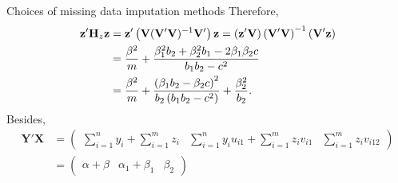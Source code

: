 \begin{frame}{Choices of missing data imputation methods}
Therefore,
    \begin{align}\label{zHzz}
        \mathbf{z}'\mathbf{H}_z \mathbf{z} &=  \mathbf{z}'\left(\mathbf{V}(\mathbf{V}'\mathbf{V})^{-1}\mathbf{V}'\right) \mathbf{z}
        = \left(\mathbf{z}'\mathbf{V}\right)\left(\mathbf{V}'\mathbf{V}\right)^{-1} \left(\mathbf{V}'\mathbf{z}\right) \notag\\
        &= \frac{\beta^2}{m} + \frac{\beta_1^2b_2+\beta_2^2b_1-2\beta_1\beta_2c}{b_1b_2-c^2}\notag\\
        &= \frac{\beta^2}{m} + \frac{\left(\beta_1b_2-\beta_2c\right)^2}{b_2\left(b_1b_2-c^2\right)} + \frac{\beta_2^2}{b_2}.
    \end{align}
    \vspace{-5pt}
    Besides,
    \begin{align*}
        \mathbf{Y}'\mathbf{X}&= \begin{pmatrix}
            \sum\limits_{i=1}^n y_i +\sum\limits_{i=1}^m z_i & \sum\limits_{i=1}^n y_iu_{i1} +\sum\limits_{i=1}^m z_iv_{i1} & \sum\limits_{i=1}^mz_iv_{i12}
        \end{pmatrix}\\
        &= \begin{pmatrix}
            \alpha + \beta & \alpha_1 + \beta_1 & \beta_2
        \end{pmatrix}
    \end{align*}
\end{frame}
